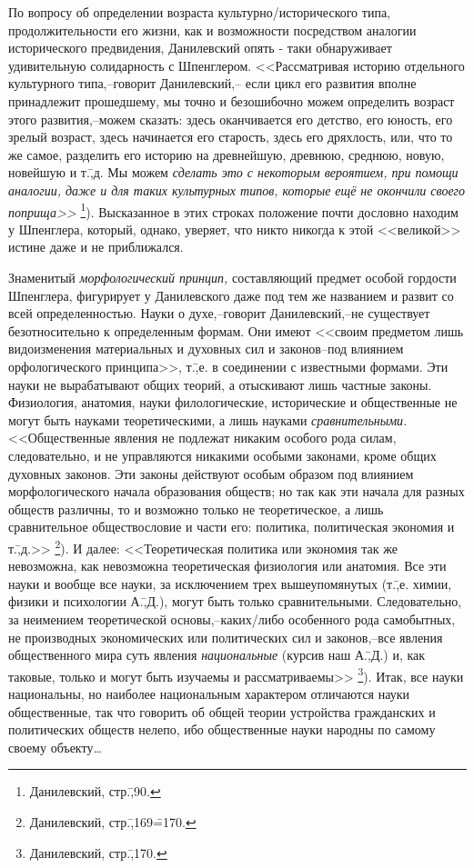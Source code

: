 По вопросу об определении возраста культурно\-/исторического типа, продолжительности его жизни, как и возможности посредством аналогии исторического предвидения, Данилевский опять - таки обнаруживает удивительную солидарность с Шпенглером. <<Рассматривая историю отдельного культурного типа,\---говорит Данилевский,\--- если цикл его развития вполне принадлежит прошедшему, мы точно и безошибочно можем определить возраст этого развития,\---можем сказать: здесь оканчивается его детство, его юность, его зрелый возраст, здесь начинается его старость, здесь его дряхлость, или, что то же самое, разделить его историю на древнейшую, древнюю, среднюю, новую, новейшую и т.\=,д. Мы можем \emph{сделать это с некоторым вероятием, при помощи аналогии, даже и для таких культурных типов, которые ещё не окончили своего поприща>>} \footnote{Данилевский, стр.\=,90.}). Высказанное в этих строках положение почти дословно находим у Шпенглера, который, однако, уверяет, что никто никогда к этой <<великой>> истине даже и не приближался.

Знаменитый \emph{морфологический принцип,} составляющий предмет особой гордости Шпенглера, фигурирует у Данилевского даже под тем же названием и развит со всей определенностью. Науки о духе,\---говорит Данилевский,\---не существует безотносительно к определенным формам. Они имеют <<своим предметом лишь видоизменения материальных и духовных сил и законов\---под влиянием орфологического принципа>>, т.\=,е. в соединении с известными формами. Эти науки не вырабатывают общих теорий, а отыскивают лишь частные законы. Физиология, анатомия, науки филологические, исторические и общественные не могут быть науками теоретическими, а лишь науками \emph{сравнительными.} <<Общественные явления не подлежат никаким особого рода силам, следовательно, и не управляются никакими особыми законами, кроме общих духовных законов. Эти законы действуют особым образом под влиянием морфологического начала образования обществ; но так как эти начала для разных обществ различны, то и возможно только не теоретическое, а лишь сравнительное обществословие и части его: политика, политическая экономия и т.\=,д.>> \footnote{Данилевский, стр.\=,169\==170.}). И далее: <<Теоретическая политика или экономия так же невозможна, как невозможна теоретическая физиология или анатомия. Все эти науки и вообще все науки, за исключением трех вышеупомянутых (т.\=,е. химии, физики и психологии А.\=,Д.), могут быть только сравнительными. Следовательно, за неимением теоретической основы,\---каких\-/либо особенного рода самобытных, не производных экономических или политических сил и законов,\---все явления общественного мира суть явления \emph{национальные} (курсив наш А.\=,Д.) и, как таковые, только и могут быть изучаемы и рассматриваемы>> \footnote{Данилевский, стр.\=,170.}). Итак, все науки национальны, но наиболее национальным характером отличаются науки общественные, так что говорить об общей теории устройства гражданских и политических обществ нелепо, ибо общественные науки народны по самому своему объекту\dots

